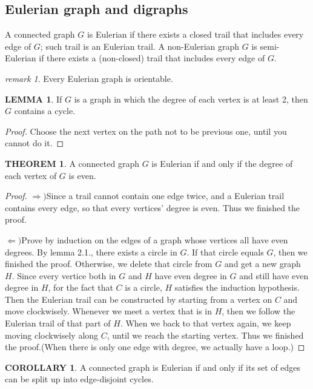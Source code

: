 \documentclass[a4paper,11pt]{article}%
\theoremstyle{remark}
\newtheorem*{remark}{remark}
\theoremstyle{definition}
\newtheorem{theorem}{THEOREM}[section]
\theoremstyle{definition}
\newtheorem{corollary}{COROLLARY}[section]
\theoremstyle{definition}
\newtheorem{lemma}{LEMMA}[section]
\theoremstyle{definition}
\theoremstyle{plain}
\theoremstyle{definition}
\begin{document}
\subsection{Eulerian graph and digraphs}
A connected graph $G$ is Eulerian if there exists a closed trail that includes
every edge of $G$; such trail is an Eulerian trail. A non-Eulerian graph $G$
is semi-Eulerian if there exists a (non-closed) trail that includes every edge
of $G$.
\begin{remark}
    Every Eulerian graph is orientable.
\end{remark}
\begin{lemma}
    If $G$ is a graph in which the degree of each vertex is at least 2, then 
    $G$ contains a cycle.
\end{lemma}
\begin{proof}
    Choose the next vertex on the path not to be previous one, until you cannot 
    do it.
\end{proof}
\begin{theorem}
    A connected graph $G$ is Eulerian if and only if the degree of each vertex
    of $G$ is even.
\end{theorem}
\begin{proof}
    $\Rightarrow)$Since a trail cannot contain one edge twice, and a Eulerian
    trail contains every edge, so that every vertices' degree is even. Thus we 
    finished the proof.

    $\Leftarrow)$Prove by induction on the edges of a graph whose 
    vertices all have even degrees.
    By lemma 2.1., there exists a circle in $G$. If that circle equals $G$,
    then we finished the proof. Otherwise, we delete that circle from $G$ 
    and get a new graph $H$. Since every vertice both in $G$ and $H$ have 
    even degree in $G$ and still have even degree in $H$, for 
    the fact that $C$ is a circle, $H$ satisfies the induction hypothesis.
    Then the Eulerian trail can be constructed by starting from a vertex on 
    $C$ and move clockwisely. Whenever we meet a vertex that is in $H$,
    then we follow the Eulerian trail of that part of $H$. When we back to 
    that vertex again, we keep moving clockwisely along $C$, until we reach the 
    starting vertex.
    Thus we finished the proof.(When there is only one edge with degree, we actually have a loop.)
\end{proof}
\begin{corollary}
    A connected graph is Eulerian if and only if its set of edges can be split 
    up into edge-disjoint cycles.
\end{corollary}
\end{document}

